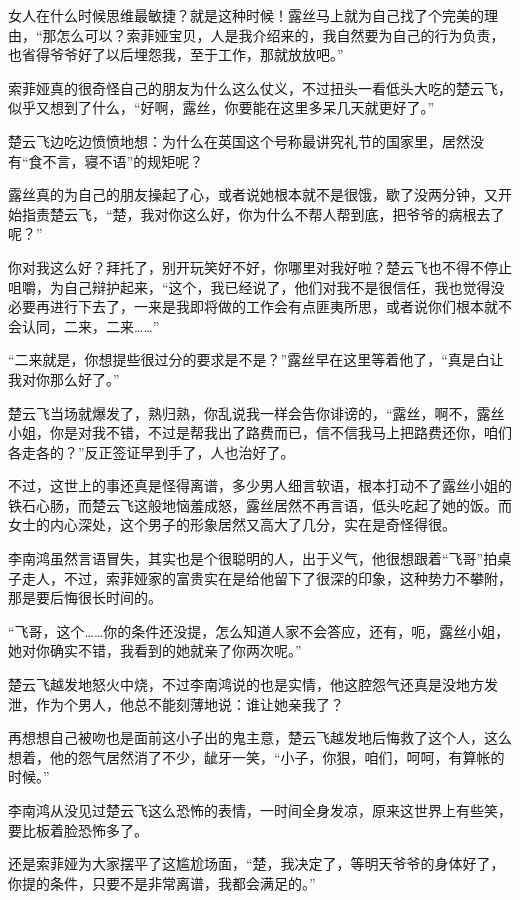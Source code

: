 女人在什么时候思维最敏捷？就是这种时候！露丝马上就为自己找了个完美的理由，“那怎么可以？索菲娅宝贝，人是我介绍来的，我自然要为自己的行为负责，也省得爷爷好了以后埋怨我，至于工作，那就放放吧。”

索菲娅真的很奇怪自己的朋友为什么这么仗义，不过扭头一看低头大吃的楚云飞，似乎又想到了什么，“好啊，露丝，你要能在这里多呆几天就更好了。”

楚云飞边吃边愤愤地想：为什么在英国这个号称最讲究礼节的国家里，居然没有“食不言，寝不语”的规矩呢？

露丝真的为自己的朋友操起了心，或者说她根本就不是很饿，歇了没两分钟，又开始指责楚云飞，“楚，我对你这么好，你为什么不帮人帮到底，把爷爷的病根去了呢？”

你对我这么好？拜托了，别开玩笑好不好，你哪里对我好啦？楚云飞也不得不停止咀嚼，为自己辩护起来，“这个，我已经说了，他们对我不是很信任，我也觉得没必要再进行下去了，一来是我即将做的工作会有点匪夷所思，或者说你们根本就不会认同，二来，二来……”

“二来就是，你想提些很过分的要求是不是？”露丝早在这里等着他了，“真是白让我对你那么好了。”

楚云飞当场就爆发了，熟归熟，你乱说我一样会告你诽谤的，“露丝，啊不，露丝小姐，你是对我不错，不过是帮我出了路费而已，信不信我马上把路费还你，咱们各走各的？”反正签证早到手了，人也治好了。

不过，这世上的事还真是怪得离谱，多少男人细言软语，根本打动不了露丝小姐的铁石心肠，而楚云飞这般地恼羞成怒，露丝居然不再言语，低头吃起了她的饭。而女士的内心深处，这个男子的形象居然又高大了几分，实在是奇怪得很。

李南鸿虽然言语冒失，其实也是个很聪明的人，出于义气，他很想跟着“飞哥”拍桌子走人，不过，索菲娅家的富贵实在是给他留下了很深的印象，这种势力不攀附，那是要后悔很长时间的。

“飞哥，这个……你的条件还没提，怎么知道人家不会答应，还有，呃，露丝小姐，她对你确实不错，我看到的她就亲了你两次呢。”

楚云飞越发地怒火中烧，不过李南鸿说的也是实情，他这腔怨气还真是没地方发泄，作为个男人，他总不能刻薄地说：谁让她亲我了？

再想想自己被吻也是面前这小子出的鬼主意，楚云飞越发地后悔救了这个人，这么想着，他的怨气居然消了不少，龇牙一笑，“小子，你狠，咱们，呵呵，有算帐的时候。”

李南鸿从没见过楚云飞这么恐怖的表情，一时间全身发凉，原来这世界上有些笑，要比板着脸恐怖多了。

还是索菲娅为大家摆平了这尴尬场面，“楚，我决定了，等明天爷爷的身体好了，你提的条件，只要不是非常离谱，我都会满足的。”

